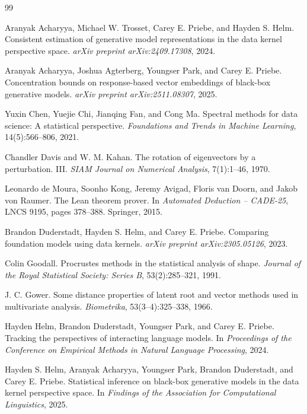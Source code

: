 \documentclass[11pt]{article}
\begin{document}
\begin{thebibliography}{99}

Aranyak Acharyya, Michael W. Trosset, Carey E. Priebe, and Hayden S. Helm.
\newblock Consistent estimation of generative model representations in the data kernel perspective space.
\newblock \emph{arXiv preprint arXiv:2409.17308}, 2024.

Aranyak Acharyya, Joshua Agterberg, Youngser Park, and Carey E. Priebe.
\newblock Concentration bounds on response-based vector embeddings of black-box generative models.
\newblock \emph{arXiv preprint arXiv:2511.08307}, 2025.

Yuxin Chen, Yuejie Chi, Jianqing Fan, and Cong Ma.
\newblock Spectral methods for data science: A statistical perspective.
\newblock \emph{Foundations and Trends in Machine Learning}, 14(5):566--806, 2021.

Chandler Davis and W. M. Kahan.
\newblock The rotation of eigenvectors by a perturbation. III.
\newblock \emph{SIAM Journal on Numerical Analysis}, 7(1):1--46, 1970.

Leonardo de Moura, Soonho Kong, Jeremy Avigad, Floris van Doorn, and Jakob von Raumer.
\newblock The Lean theorem prover.
\newblock In \emph{Automated Deduction -- CADE-25}, LNCS 9195, pages 378--388. Springer, 2015.

Brandon Duderstadt, Hayden S. Helm, and Carey E. Priebe.
\newblock Comparing foundation models using data kernels.
\newblock \emph{arXiv preprint arXiv:2305.05126}, 2023.

Colin Goodall.
\newblock Procrustes methods in the statistical analysis of shape.
\newblock \emph{Journal of the Royal Statistical Society: Series B}, 53(2):285--321, 1991.

J. C. Gower.
\newblock Some distance properties of latent root and vector methods used in multivariate analysis.
\newblock \emph{Biometrika}, 53(3--4):325--338, 1966.

Hayden Helm, Brandon Duderstadt, Youngser Park, and Carey E. Priebe.
\newblock Tracking the perspectives of interacting language models.
\newblock In \emph{Proceedings of the Conference on Empirical Methods in Natural Language Processing}, 2024.

Hayden S. Helm, Aranyak Acharyya, Youngser Park, Brandon Duderstadt, and Carey E. Priebe.
\newblock Statistical inference on black-box generative models in the data kernel perspective space.
\newblock In \emph{Findings of the Association for Computational Linguistics}, 2025.


\end{thebibliography}
\end{document}
